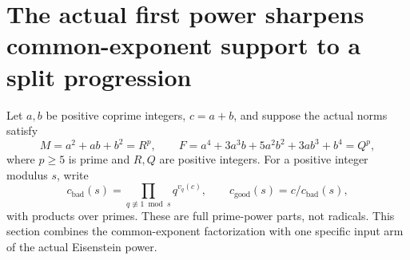 \section{The actual first power sharpens common-exponent support to a split progression}
\label{acs-section}

Let $a,b$ be positive coprime integers, $c=a+b$, and suppose the actual
norms satisfy
\begin{equation}\label{acs-pure}
 M=a^2+ab+b^2=R^p,\qquad
 F=a^4+3a^3b+5a^2b^2+3ab^3+b^4=Q^p,
\end{equation}
where $p\ge5$ is prime and $R,Q$ are positive integers. For a positive
integer modulus $s$, write
\[
 c_{\mathrm{bad}}(s)=\prod_{q\not\equiv1\bmod s}q^{v_q(c)},
 \qquad c_{\mathrm{good}}(s)=c/c_{\mathrm{bad}}(s),
\]
with products over primes. These are full prime-power parts, not
radicals. This section combines the common-exponent factorization with
one specific input arm of the actual Eisenstein power.

